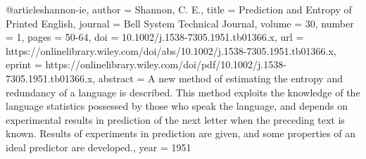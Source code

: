 @article{shannon-ie,
author = {Shannon, C. E.},
title = {Prediction and Entropy of Printed English},
journal = {Bell System Technical Journal},
volume = {30},
number = {1},
pages = {50-64},
doi = {10.1002/j.1538-7305.1951.tb01366.x},
url = {https://onlinelibrary.wiley.com/doi/abs/10.1002/j.1538-7305.1951.tb01366.x},
eprint = {https://onlinelibrary.wiley.com/doi/pdf/10.1002/j.1538-7305.1951.tb01366.x},
abstract = {A new method of estimating the entropy and redundancy of a language is described. This method exploits the knowledge of the language statistics possessed by those who speak the language, and depends on experimental results in prediction of the next letter when the preceding text is known. Results of experiments in prediction are given, and some properties of an ideal predictor are developed.},
year = {1951}
}